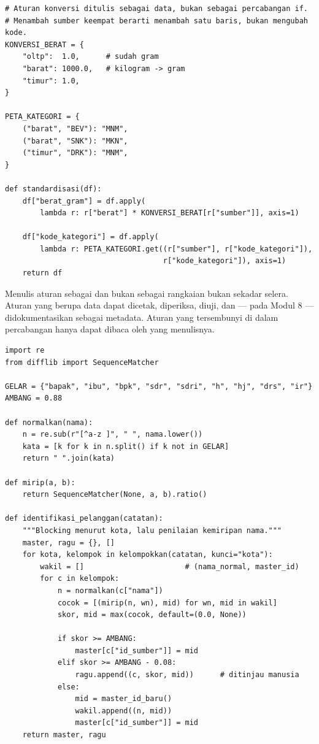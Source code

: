 
\begin{lstlisting}[style=pythongaya]
# Aturan konversi ditulis sebagai data, bukan sebagai percabangan if.
# Menambah sumber keempat berarti menambah satu baris, bukan mengubah kode.
KONVERSI_BERAT = {
    "oltp":  1.0,      # sudah gram
    "barat": 1000.0,   # kilogram -> gram
    "timur": 1.0,
}

PETA_KATEGORI = {
    ("barat", "BEV"): "MNM",
    ("barat", "SNK"): "MKN",
    ("timur", "DRK"): "MNM",
}

def standardisasi(df):
    df["berat_gram"] = df.apply(
        lambda r: r["berat"] * KONVERSI_BERAT[r["sumber"]], axis=1)

    df["kode_kategori"] = df.apply(
        lambda r: PETA_KATEGORI.get((r["sumber"], r["kode_kategori"]),
                                    r["kode_kategori"]), axis=1)
    return df
\end{lstlisting}

\begin{catatan}
Menulis aturan sebagai  dan bukan sebagai rangkaian
 bukan sekadar selera. Aturan yang berupa data dapat dicetak,
diperiksa, diuji, dan --- pada Modul 8 --- didokumentasikan sebagai metadata.
Aturan yang tersembunyi di dalam percabangan hanya dapat dibaca oleh yang
menulisnya.
\end{catatan}


\begin{lstlisting}[style=pythongaya]
import re
from difflib import SequenceMatcher

GELAR = {"bapak", "ibu", "bpk", "sdr", "sdri", "h", "hj", "drs", "ir"}
AMBANG = 0.88

def normalkan(nama):
    n = re.sub(r"[^a-z ]", " ", nama.lower())
    kata = [k for k in n.split() if k not in GELAR]
    return " ".join(kata)

def mirip(a, b):
    return SequenceMatcher(None, a, b).ratio()

def identifikasi_pelanggan(catatan):
    """Blocking menurut kota, lalu penilaian kemiripan nama."""
    master, ragu = {}, []
    for kota, kelompok in kelompokkan(catatan, kunci="kota"):
        wakil = []                       # (nama_normal, master_id)
        for c in kelompok:
            n = normalkan(c["nama"])
            cocok = [(mirip(n, wn), mid) for wn, mid in wakil]
            skor, mid = max(cocok, default=(0.0, None))

            if skor >= AMBANG:
                master[c["id_sumber"]] = mid
            elif skor >= AMBANG - 0.08:
                ragu.append((c, skor, mid))      # ditinjau manusia
            else:
                mid = master_id_baru()
                wakil.append((n, mid))
                master[c["id_sumber"]] = mid
    return master, ragu
\end{lstlisting}

